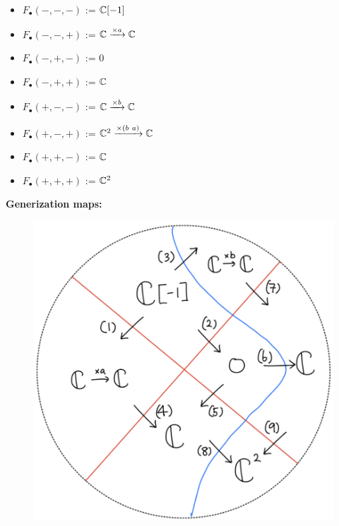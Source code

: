 \begin{itemize}
\item $F_\bullet(-,-,-)$ := $\mathbb{C}[-1]$
\item $F_\bullet(-,-,+)$ := $\mathbb{C} \xrightarrow{\times a} \mathbb{C} $
\item $F_\bullet(-,+,-)$ := $0$
\item $F_\bullet(-,+,+)$ := $\mathbb{C}$
\item $F_\bullet(+,-,-)$ := $\mathbb{C} \xrightarrow{\times b} \mathbb{C} $
\item $F_\bullet(+,-,+)$ := $\mathbb{C}^2 \xrightarrow{\times (b ~ a)} \mathbb{C} $
\item $F_\bullet(+,+,-)$ := $\mathbb{C}$
\item $F_\bullet(+,+,+)$ := $\mathbb{C}^2$
\end{itemize}

\textbf{Generization maps:}
\begin{figure}[H]
    \centering
    \includegraphics[scale = 0.45]{diagrams/lemma4/28.png}
    \caption{}
    \label{fig:your-label}
\end{figure}
